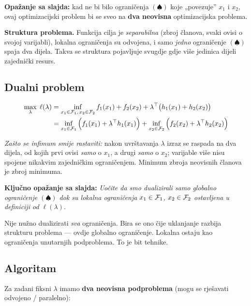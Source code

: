 \textbf{Opažanje sa slajda:} kad ne bi bilo ograničenja $(\spadesuit)$ koje
„povezuje” $x_1$ i $x_2$, ovaj optimizacijski problem bi se sveo na
\textbf{dva neovisna} optimizacijska problema.

\textbf{Struktura problema.} Funkcija cilja je \emph{separabilna} (zbroj
članova, svaki ovisi o svojoj varijabli), lokalna ograničenja su odvojena, i
samo \emph{jedno} ograničenje $(\spadesuit)$ spaja dva dijela. Takva se
struktura pojavljuje svugdje gdje više jedinica dijeli zajednički resurs.

\subsection{Dualni problem}

\begin{align}
\max_\lambda\; \ell(\lambda)
&= \inf_{x_1\in\mathcal{F}_1,\,x_2\in\mathcal{F}_2}
   f_1(x_1) + f_2(x_2) + \lambda^{\top}\big(h_1(x_1) + h_2(x_2)\big) \\
&= \inf_{x_1\in\mathcal{F}_1}\Big(f_1(x_1) + \lambda^{\top} h_1(x_1)\Big)
 + \inf_{x_2\in\mathcal{F}_2}\Big(f_2(x_2) + \lambda^{\top} h_2(x_2)\Big)
\end{align}

\emph{Zašto se infimum smije rastaviti:} nakon uvrštavanja $\lambda$ izraz se
raspada na dva dijela, od kojih prvi ovisi \emph{samo} o $x_1$, a drugi
\emph{samo} o $x_2$; varijable više nisu spojene nikakvim zajedničkim
ograničenjem. Minimum zbroja neovisnih članova je zbroj minimuma.

\textbf{Ključno opažanje sa slajda:} \emph{Uočite da smo dualizirali samo
globalno ograničenje $(\spadesuit)$ dok su lokalna ograničenja
$x_1 \in \mathcal{F}_1$, $x_2 \in \mathcal{F}_2$ ostavljena u definiciji od $\ell(\lambda)$.}

\begin{napomena}
Nije nužno dualizirati \emph{sva} ograničenja. Bira se ono čije uklanjanje
razbija strukturu problema --- ovdje globalno ograničenje. Lokalna ostaju kao
ograničenja unutarnjih podproblema. To je bit tehnike.
\end{napomena}

\subsection{Algoritam}

Za zadani fiksni $\lambda$ imamo \textbf{dva neovisna podproblema} (mogu se
rješavati odvojeno / paralelno):

